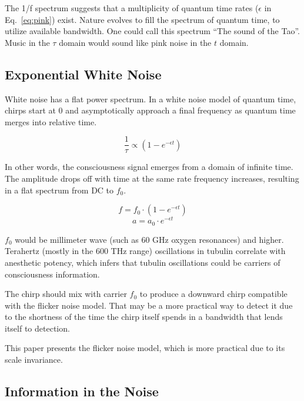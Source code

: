 The 1/f spectrum suggests that a multiplicity of quantum time rates
($\epsilon$ in Eq.~\ref{eq:pink}) exist.
Nature evolves to fill the spectrum of quantum time, to utilize available
bandwidth. One could call this spectrum ``The sound of the Tao''.
Music in the $\tau$ domain would sound like pink noise in the $t$ domain.

\subsection{Exponential White Noise}

White noise has a flat power spectrum.
In a white noise model of quantum time, chirps start at 0 and asymptotically
approach a final frequency as quantum time merges into relative time.

\begin{equation} \label{eq:white}
\frac{1}{\tau} \propto (1-e^{-\epsilon t})
\end{equation}

In other words, the consciousness signal emerges from a domain of infinite time.
The amplitude drops off with time at the same rate frequency increases,
resulting in a flat spectrum from DC to $f_0$.

\begin{equation}
f = f_0 \cdot (1-e^{-\epsilon t})
\end{equation}
\begin{equation}
a = a_0 \cdot e^{-\epsilon t}
\end{equation}

$f_0$ would be millimeter wave (such as 60 GHz oxygen resonances) and higher.
Terahertz (mostly in the 600 THz range) oscillations in tubulin \cite{Craddock}
correlate with anesthetic potency, which infers that
tubulin oscillations could be carriers of consciousness information.

The chirp should mix with carrier $f_0$ to produce a downward chirp
compatible with the flicker noise model.
That may be a more practical way to detect it due to the shortness of the
time the chirp itself spends in a bandwidth that lends itself to detection.

This paper presents the flicker noise model, which is more practical due to
its scale invariance.

\subsection{Information in the Noise}

